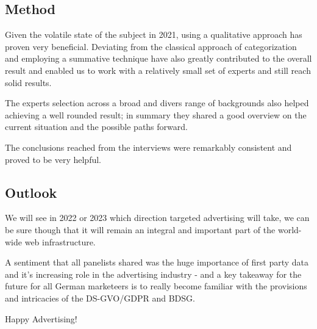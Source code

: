 \subsection{Method}

Given the volatile state of the subject in 2021, using a qualitative approach has proven very beneficial. Deviating from the classical approach of categorization and employing a summative technique have also greatly contributed to the overall result and enabled us to work with a relatively small set of experts and still reach solid results.

The experts selection across a broad and divers range of backgrounds also helped achieving a well rounded result; in summary they shared a good overview on the current situation and the possible paths forward.

The conclusions reached from the interviews were remarkably consistent and proved to be very helpful.

\subsection{Outlook}

We will see in 2022 or 2023 which direction targeted advertising will take, we can be sure though that it will remain an integral and important part of the world-wide web infrastructure.

A sentiment that all panelists shared was the huge importance of first party data and it's increasing role in the advertising industry - and a key takeaway for the future for all German marketeers is to really become familiar with the provisions and intricacies of the DS-GVO/GDPR and BDSG.

\par\medskip

Happy Advertising!
